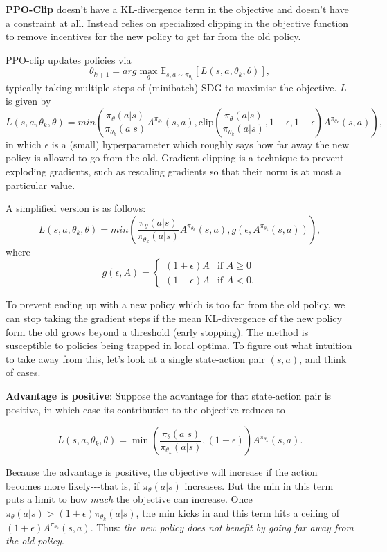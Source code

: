\documentclass[12pt,a4paper]{article}
\begin{document}
\textbf{PPO-Clip} doesn’t have a KL-divergence term in the objective and doesn’t have a constraint at all. Instead relies on specialized clipping in the objective function to remove incentives for the new policy to get far from the old policy.

PPO-clip updates policies via $$\theta_{k+1} = arg \max_\theta \mathbb{E}_{s,a \sim \pi_{\theta_k}} \left[ L(s,a,\theta_k,\theta) \right],$$ typically taking multiple steps of (minibatch) SDG to maximise the objective. $L$ is given by $$L(s,a,\theta_k,\theta) = min \left(\frac{\pi_\theta(a|s)}{\pi_{\theta_k}(a|s)} A^{\pi_{\theta_k}}(s,a), \text{clip} \left( \frac{\pi_\theta(a|s)}{\pi_{\theta_k}(a|s)}, 1 - \epsilon, 1 + \epsilon \right) A^{\pi_{\theta_k}}(s,a) \right),$$ in which $\epsilon$ is a (small) hyperparameter which roughly says how far away the new policy is allowed to go from the old. Gradient clipping is a technique to prevent exploding gradients, such as rescaling gradients so that their norm is at most a particular value. 

A simplified version is as follows: $$L(s,a,\theta_k,\theta) = min \left( \frac{\pi_\theta(a|s)}{\pi_{\theta_k}(a|s)} A^{\pi_{\theta_k}}(s,a), g(\epsilon, A^{\pi_{\theta_k}}(s,a)) \right),$$ where $$g(\epsilon, A) = \begin{cases} (1+\epsilon)A & \mbox{if } A \geq 0 \\ (1-\epsilon)A & \mbox{if } A < 0. \end{cases}$$

To prevent ending up with a new policy which is too far from the old policy, we can stop taking the gradient steps if the mean KL-divergence of the new policy form the old grows beyond a threshold (early stopping). The method is susceptible to policies being trapped in local optima. To figure out what intuition to take away from this, let's look at a
single state-action pair \((s,a)\), and think of cases.

\textbf{Advantage is positive}: Suppose the advantage for that
state-action pair is positive, in which case its contribution to the
objective reduces to

\[L(s,a,\theta_k,\theta) = \min\left(
\frac{\pi_{\theta}(a|s)}{\pi_{\theta_k}(a|s)}, (1 + \epsilon)
\right)  A^{\pi_{\theta_k}}(s,a).\]

Because the advantage is positive, the objective will increase if the
action becomes more likely-\/-\/-that is, if \(\pi_{\theta}(a|s)\)
increases. But the min in this term puts a limit to how \emph{much} the
objective can increase. Once
\(\pi_{\theta}(a|s) > (1+\epsilon) \pi_{\theta_k}(a|s)\), the min kicks
in and this term hits a ceiling of
\((1+\epsilon) A^{\pi_{\theta_k}}(s,a)\). Thus: \emph{the new policy
does not benefit by going far away from the old policy}.
\end{document}
